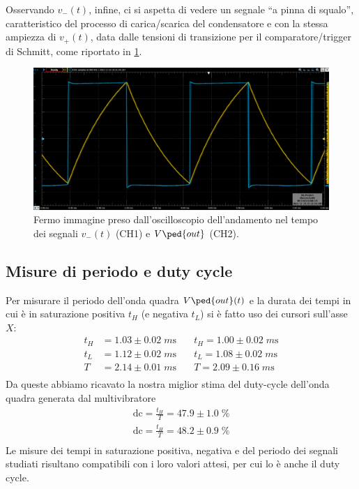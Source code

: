 \documentclass[10pt, a4paper, italian]{article}
\begin{document}
Osservando $v_- (t)$, infine, ci si aspetta di vedere un segnale ``a pinna di
squalo'', caratteristico del processo di carica/scarica del condensatore e
con la stessa ampiezza di $v_+ (t)$, data dalle tensioni di transizione per
il comparatore/trigger di Schmitt, come riportato in \cref{fig: v-vout}.
\begin{figure}[htbp]
\centering
\includegraphics[scale=0.4]{V-Vout}
\caption{Fermo immagine preso dall'oscilloscopio dell'andamento nel tempo dei
segnali $v_- (t)$ (CH1) e $V\ped{out}$ (CH2). \label{fig: v-vout}}
\end{figure}

\subsection{Misure di periodo e duty cycle}
Per misurare il periodo dell'onda quadra $V\ped{out} (t)$ e la durata dei
tempi in cui è in saturazione positiva $t_H$ (e negativa $t_L$) si è fatto
uso dei cursori sull'asse $X$:
\begin{align*}
t_H &= 1.03 \pm 0.02 \; \si{m\s} &\quad t_H = 1.00 \pm 0.02 \; \si{m\s} \\
t_L &= 1.12 \pm 0.02 \; \si{m\s} &\quad t_L = 1.08 \pm 0.02 \; \si{m\s} \\
T &= 2.14 \pm 0.01 \; \si{m\s}  &\quad T = 2.09 \pm 0.16 \; \si{m\s} \\
\end{align*}
Da queste abbiamo ricavato la nostra miglior stima del duty-cycle dell'onda
quadra generata dal multivibratore
\begin{align*}
\mathrm{dc} = \frac{t_H}{T} = 47.9 \pm 1.0 \; \% \\
\mathrm{dc} = \frac{t_H}{T} = 48.2 \pm 0.9 \; \% \\
\end{align*}
Le misure dei tempi in saturazione positiva, negativa e del periodo dei
segnali studiati risultano compatibili con i loro valori attesi, per cui
lo è anche il duty cycle.
\end{document}
